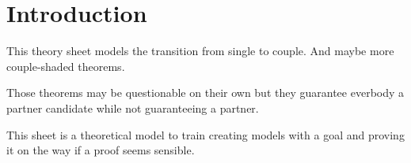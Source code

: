 \section{Introduction}
\label{sec:en:introduction}

This theory sheet models the transition from single to couple. And maybe more couple-shaded theorems.

Those theorems may be questionable on their own but they guarantee everbody a partner candidate while not guaranteeing a partner.

This sheet is a theoretical model to train creating models with a goal and proving it on the way if a proof seems sensible.
